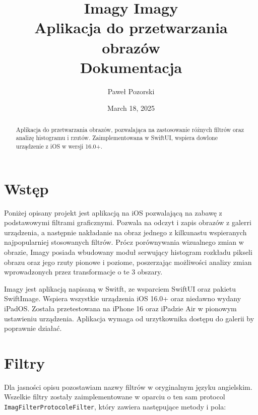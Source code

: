 \documentclass[a4paper]{article}
\title{Imagy}
\title{
    Imagy\\ \large 
    Aplikacja do przetwarzania obrazów \\
    Dokumentacja}
\author{Paweł Pozorski}
\date{March 18, 2025}
\begin{document}
\maketitle
\begin{abstract}
    Aplikacja do przetwarzania obrazów, pozwalająca na zastosowanie różnych filtrów oraz analizę histogramu i rzutów. Zaimplementowana w SwiftUI, wspiera dowlone urządzenie z iOS w wersji 16.0+.
\end{abstract}

\newpage
\tableofcontents
\newpage

\section{Wstęp}

Poniżej opisany projekt jest aplikacją na iOS pozwalającą na zabawę z podstawowymi filtrami graficznymi. Pozwala na odczyt i zapis obrazów z galerri urządzenia, a następnie nakładanie na obraz jednego z kilkunastu wspieranych najpopularniej stosowanych filtrów. Prócz porównywania wizualnego zmian w obrazie, Imagy posiada wbudowany moduł serwujący histogram rozkładu pikseli obrazu oraz jego rzuty pionowe i poziome, poszerzając możliwości analizy zmian wprowadzonych przez transformacje o te 3 obszary.

Imagy jest aplikacją napisaną w Switft, ze wsparciem SwiftUI oraz pakietu SwiftImage. Wspiera wszystkie urządzenia iOS 16.0+ oraz niedawno wydany iPadOS. Została przetestowana na iPhone 16 oraz iPadzie Air w pionowym ustawieniu urządzenia. Aplikacja wymaga od urzytkownika dostępu do galerii by poprawnie działać.

\section{Filtry}
\label{Filtry}

Dla jasności opisu pozostawiam nazwy filtrów w oryginalnym języku angielskim. Wszelkie filtry zostały zaimplementowane w oparciu o ten sam protocol \texttt{ImagFilterProtocoleFilter}, który zawiera następujące metody i pola:
\end{document}
